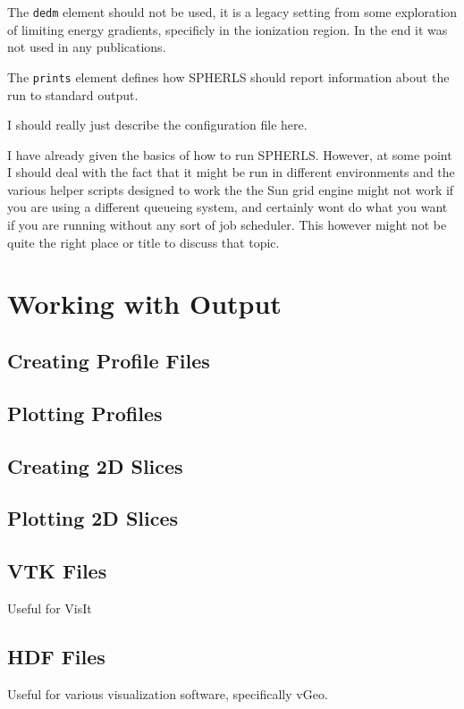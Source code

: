 \documentclass[12pt,a4paper]{book}
\begin{document}
The {\tt dedm} element should not be used, it is a legacy setting from some exploration of limiting energy gradients, specificly in the ionization region. In the end it was not used in any publications.

The {\tt prints} element defines how SPHERLS should report information about the run to standard output.

I should really just describe the configuration file here.

I have already given the basics of how to run SPHERLS. However, at some point I should deal with the fact that it might be run in different environments and the various helper scripts designed to work the the Sun grid engine might not work if you are using a different queueing system, and certainly wont do what you want if you are running without any sort of job scheduler. This however might not be quite the right place or title to discuss that topic.

\section{Working with Output}
\subsection{Creating Profile Files}
\subsection{Plotting Profiles}
\subsection{Creating 2D Slices}
\subsection{Plotting 2D Slices}
\subsection{VTK Files}
Useful for VisIt
\subsection{HDF Files}
Useful for various visualization software, specifically vGeo.
\end{document}

